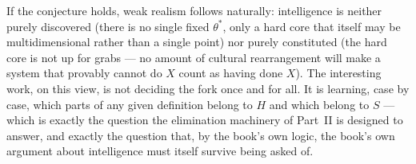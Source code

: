 If the conjecture holds, weak realism follows naturally: intelligence is neither purely discovered (there is no single fixed $\theta^*$, only a hard core that itself may be multidimensional rather than a single point) nor purely constituted (the hard core is not up for grabs --- no amount of cultural rearrangement will make a system that provably cannot do $X$ count as having done $X$). The interesting work, on this view, is not deciding the fork once and for all. It is learning, case by case, which parts of any given definition belong to $H$ and which belong to $S$ --- which is exactly the question the elimination machinery of Part~II is designed to answer, and exactly the question that, by the book's own logic, the book's own argument about intelligence must itself survive being asked of.
